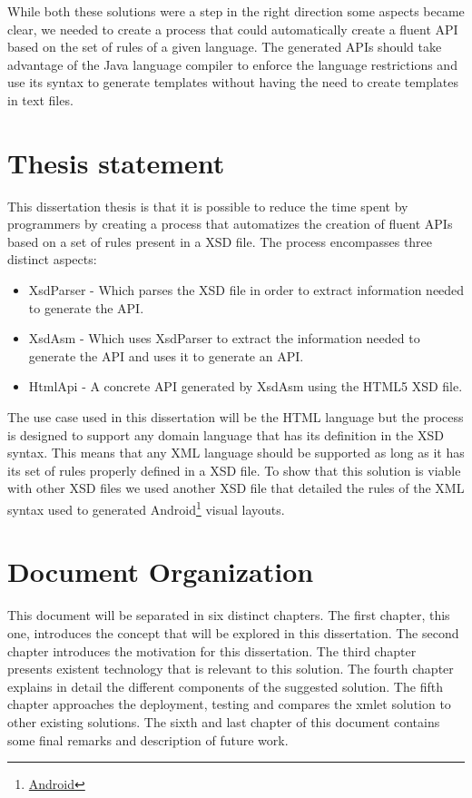 \noindent
While both these solutions were a step in the right direction some aspects became clear, we needed to create a process that could automatically create a fluent \ac{API} based on the set of rules of a given language. The generated \ac{API}s should take advantage of the Java language compiler to enforce the language restrictions and use its syntax to generate templates without having the need to create templates in text files.

\newpage

\section{Thesis statement}

This dissertation thesis is that it is possible to reduce the time spent by programmers by creating a process that automatizes the creation of fluent \ac{API}s based on a set of rules present in a \ac{XSD} file. The process encompasses three distinct aspects:

\begin{itemize}
	\item XsdParser - Which parses the \ac{XSD} file in order to extract information needed to generate the \ac{API}.
	\item XsdAsm - Which uses XsdParser to extract the information needed to generate the \ac{API} and uses it to generate an \ac{API}.
	\item HtmlApi - A concrete \ac{API} generated by XsdAsm using the \ac{HTML}5 \ac{XSD} file.
\end{itemize}

\noindent
The use case used in this dissertation will be the \ac{HTML} language but the process is designed to support any domain language that has its definition in the \ac{XSD} syntax. This means that any \ac{XML} language should be supported as long as it has its set of rules properly defined in a \ac{XSD} file. To show that this solution is viable with other \ac{XSD} files we used another \ac{XSD} file that detailed the rules of the \ac{XML} syntax used to generated Android\footnote{\href{https://www.android.com/}{Android}} visual layouts.

\section{Document Organization}

This document will be separated in six distinct chapters. The first chapter, this one, introduces the concept that will be explored in this dissertation. The second chapter introduces the motivation for this dissertation. The third chapter presents existent technology that is relevant to this solution. The fourth chapter explains in detail the different components of the suggested solution. The fifth chapter approaches the deployment, testing and compares the \ac{xmlet} solution to other existing solutions. The sixth and last chapter of this document contains some final remarks and description of future work.